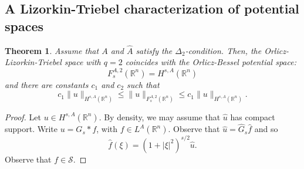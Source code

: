 \documentclass[leqno,twoside, 12pt]{amsart}
\theoremstyle{plain}
\numberwithin{equation}{section} \numberwithin{figure}{section}
\newtheorem{theorem}{Theorem}[section]
\theoremstyle{definition}
\newcommand{\R}{\mathbb R}
\numberwithin{equation}{section}
\begin{document}
\subsection{A Lizorkin-Triebel characterization of potential spaces}



\begin{theorem} \label{teo.lt}
Assume that $A$ and $\hat A$ satisfy the $\Delta_2$-condition. Then, the Orlicz-Lizorkin-Triebel space with $q=2$ coincides with the Orlicz-Bessel potential space:
$$
F_s^{A,2}(\R^n)=H^{s,A}(\R^n)
$$
and there are constants $c_1$ and $c_2$ such that
$$
c_1 \|u\|_{H^{s,A}(\R^n)}\leq \|u\|_{F^{A,2}_s(\R^n)} \leq c_1 \|u\|_{H^{s,A}(\R^n)}.
$$
\end{theorem}

\begin{proof}
Let $u\in H^{s, A}(\R^n)$. By density, we may assume that $\hat u$ has compact support. Write $u=G_s*f$, with $f\in L^A(\R^n)$. Observe that $\hat u=\hat G_s \hat f$ and so
\begin{equation}\label{f hat}
\hat f(\xi) = (1+|\xi|^2)^{s/2}\hat u.
\end{equation}Observe that $f\in \mathcal{S}$.


\end{proof}
\end{document}
